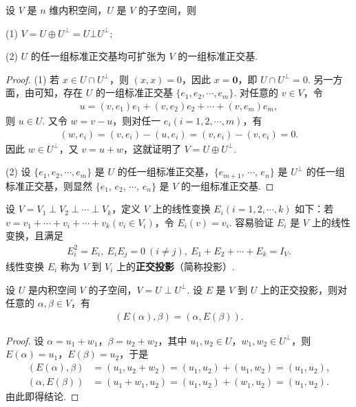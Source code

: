 \documentclass[../../main.tex]{subfiles}
\begin{document}
\begin{theorem}
设 $V$ 是 $n$ 维内积空间，$U$ 是 $V$ 的子空间，则

(1) $V = U \oplus U^\perp=U\bot U^{\bot}$;

(2) $U$ 的任一组标准正交基均可扩张为 $V$ 的一组标准正交基.
\end{theorem}
\begin{proof}
(1) 若 $x \in U \cap U^\perp$，则 $(x, x) = 0$，因此 $x = \mathbf{0}$，即 $U \cap U^\perp = 0$. 另一方面，由可知，存在 $U$ 的一组标准正交基 $\{e_1, e_2, \cdots, e_m\}$. 对任意的 $v \in V$，令
\begin{align*}
u = (v, e_1)e_1 + (v, e_2)e_2 + \cdots + (v, e_m)e_m,
\end{align*}
则 $u \in U$. 又令 $w = v - u$，则对任一 $e_i (i = 1, 2, \cdots, m)$，有
\begin{align*}
(w, e_i) = (v, e_i) - (u, e_i) = (v, e_i) - (v, e_i) = 0.
\end{align*}
因此 $w \in U^\perp$，又 $v = u + w$，这就证明了 $V = U \oplus U^\perp$.

(2) 设 $\{e_1, e_2, \cdots, e_m\}$ 是 $U$ 的任一组标准正交基，$\{e_{m + 1}$, $\cdots$, $e_n\}$ 是 $U^\perp$ 的任一组标准正交基，则显然 $\{e_1$, $e_2$, $\cdots$, $e_n\}$ 是 $V$ 的一组标准正交基. 
\end{proof}


\begin{definition}[正交投影]
设 $V = V_1 \perp V_2 \perp \cdots \perp V_k$，定义 $V$ 上的线性变换 $E_i (i = 1, 2, \cdots, k)$ 如下：若 $v = v_1 + \cdots + v_i + \cdots + v_k (v_i \in V_i)$，令 $E_i(v) = v_i$. 容易验证 $E_i$ 是 $V$ 上的线性变换，且满足
\begin{align*}
E_i^2 = E_i, \ E_iE_j = 0\ (i \neq j), \ E_1 + E_2 + \cdots + E_k = I_V.
\end{align*}
线性变换 $E_i$ 称为 $V$ 到 $V_i$ 上的\textbf{正交投影}（简称投影）.
\end{definition}

\begin{proposition}\label{proposition:正交投影的性质}
设 $U$ 是内积空间 $V$ 的子空间，$V = U \perp U^\perp$. 设 $E$ 是 $V$ 到 $U$ 上的正交投影，则对任意的 $\alpha, \beta \in V$，有
\begin{align*}
(E(\alpha), \beta) = (\alpha, E(\beta)).
\end{align*}
\end{proposition}
\begin{proof}
设 $\alpha = u_1 + w_1$，$\beta = u_2 + w_2$，其中 $u_1, u_2 \in U$，$w_1, w_2 \in U^\perp$，则 $E(\alpha) = u_1$，$E(\beta) = u_2$，于是
\begin{align*}
(E(\alpha), \beta) &= (u_1, u_2 + w_2) = (u_1, u_2) + (u_1, w_2) = (u_1, u_2), \\
(\alpha, E(\beta)) &= (u_1 + w_1, u_2) = (u_1, u_2) + (w_1, u_2) = (u_1, u_2).
\end{align*}
由此即得结论.
\end{proof}
\end{document}
